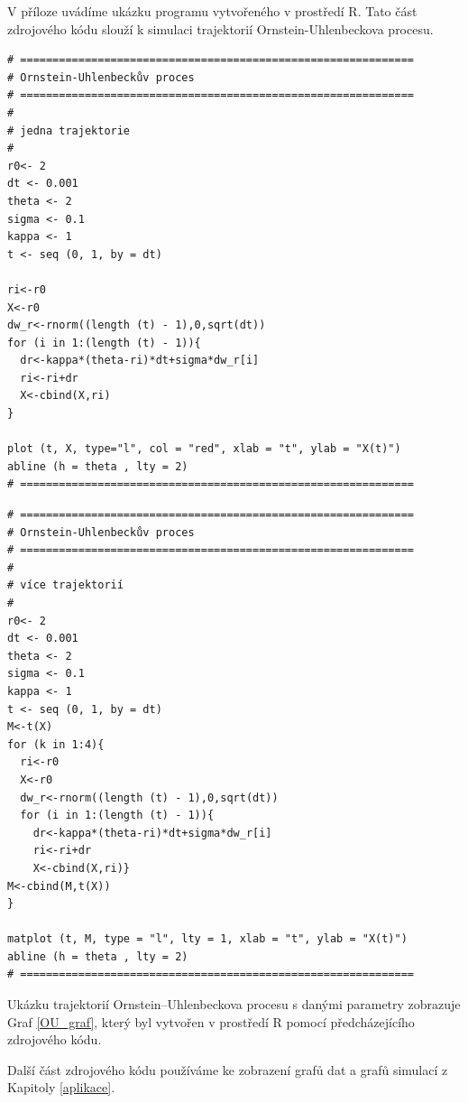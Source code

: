 \documentclass[a4paper,12pt]{report}
\theoremstyle{definition} \newtheorem{definice}[veta]{Definice}
\theoremstyle{remark}
\begin{document}
V příloze uvádíme ukázku programu vytvořeného v prostředí R. 
Tato část zdrojového kódu slouží k simulaci trajektorií Ornstein-Uhlenbeckova procesu.

\begin{verbatim}
# =============================================================
# Ornstein-Uhlenbeckův proces 
# =============================================================
#
# jedna trajektorie
#
r0<- 2
dt <- 0.001
theta <- 2
sigma <- 0.1
kappa <- 1
t <- seq (0, 1, by = dt)

ri<-r0
X<-r0
dw_r<-rnorm((length (t) - 1),0,sqrt(dt))    
for (i in 1:(length (t) - 1)){  
  dr<-kappa*(theta-ri)*dt+sigma*dw_r[i] 
  ri<-ri+dr
  X<-cbind(X,ri)
}

plot (t, X, type="l", col = "red", xlab = "t", ylab = "X(t)")
abline (h = theta , lty = 2)  
# =============================================================
\end{verbatim}

\newpage

\begin{verbatim}
# =============================================================
# Ornstein-Uhlenbeckův proces 
# =============================================================
#
# více trajektorií
#
r0<- 2
dt <- 0.001
theta <- 2
sigma <- 0.1
kappa <- 1
t <- seq (0, 1, by = dt)
M<-t(X)
for (k in 1:4){
  ri<-r0
  X<-r0
  dw_r<-rnorm((length (t) - 1),0,sqrt(dt))    
  for (i in 1:(length (t) - 1)){  
    dr<-kappa*(theta-ri)*dt+sigma*dw_r[i] 
    ri<-ri+dr
    X<-cbind(X,ri)}
M<-cbind(M,t(X))
}

matplot (t, M, type = "l", lty = 1, xlab = "t", ylab = "X(t)")
abline (h = theta , lty = 2)  
# =============================================================
\end{verbatim}

Ukázku trajektorií Ornstein–Uhlenbeckova procesu s danými parametry zobrazuje Graf \ref{OU_graf}, který byl vytvořen v prostředí R pomocí předcházejícího zdrojového kódu.

\newpage
Další část zdrojového kódu používáme ke zobrazení grafů dat a grafů simulací z Kapitoly \ref{aplikace}.
\end{document}
